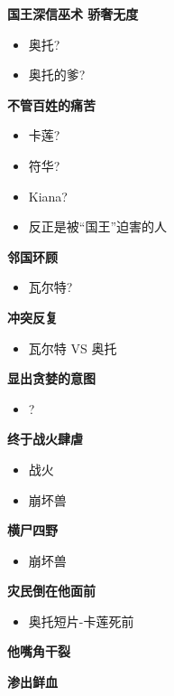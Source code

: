 \documentclass[a4paper]{article}
\begin{document}
\textbf{国王深信巫术 骄奢无度}

\begin{itemize}
    \item 奥托?
    \item 奥托的爹?
\end{itemize}

\textbf{不管百姓的痛苦}

\begin{itemize}
    \item 卡莲?
    \item 符华?
    \item Kiana?
    \item 反正是被“国王”迫害的人
\end{itemize}

\textbf{邻国环顾}

\begin{itemize}
    \item 瓦尔特?
\end{itemize}

\textbf{冲突反复}

\begin{itemize}
    \item 瓦尔特 VS 奥托
\end{itemize}

\textbf{显出贪婪的意图}

\begin{itemize}
    \item ?
\end{itemize}

\textbf{终于战火肆虐}

\begin{itemize}
    \item 战火
    \item 崩坏兽
\end{itemize}

\textbf{横尸四野}

\begin{itemize}
    \item 崩坏兽
\end{itemize}

\textbf{灾民倒在他面前}

\begin{itemize}
    \item 奥托短片-卡莲死前
\end{itemize}

\textbf{他嘴角干裂}

\textbf{渗出鲜血}
\end{document}

